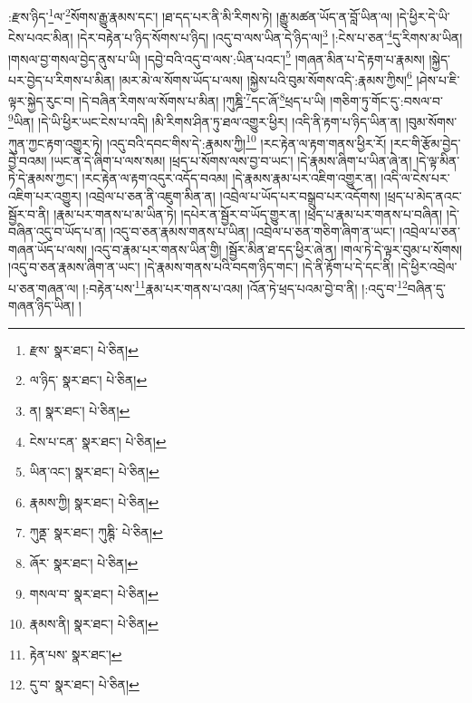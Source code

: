 :རྫས་ཉིད་\footnote{རྫས་  སྣར་ཐང་།  པེ་ཅིན། }ལ་\footnote{ལ་ཉིད་  སྣར་ཐང་།  པེ་ཅིན། }སོགས་རྒྱུ་རྣམས་དང་། །ཐ་དད་པར་ནི་མི་རིགས་ཏེ། །རྒྱུ་མཚན་ཡོད་ན་བློ་ཡིན་ལ། །དེ་ཕྱིར་དེ་ཡི་ངེས་པའང་མིན། །དེར་བརྟེན་པ་ཉིད་སོགས་པ་ཉིད། །འདུ་བ་ལས་ཡིན་དེ་ཉིད་ལ།\footnote{ན།  སྣར་ཐང་།  པེ་ཅིན། } །:ངེས་པ་ཅན་\footnote{ངེས་པ་ངན་  སྣར་ཐང་།  པེ་ཅིན། }དུ་རིགས་མ་ཡིན། །གསལ་བྱ་གསལ་བྱེད་ནུས་པ་ཡི། །དབྱེ་བའི་འདུ་བ་ལས་:ཡིན་པའང་།\footnote{ཡིན་འང་།  སྣར་ཐང་།  པེ་ཅིན། } །གཞན་མིན་པ་དེ་རྟག་པ་རྣམས། །སྐྱེད་པར་བྱེད་པ་རིགས་པ་མིན། །མར་མེ་ལ་སོགས་ཡོད་པ་ལས། །སྐྱེས་པའི་བུམ་སོགས་འདི་:རྣམས་ཀྱིས།\footnote{རྣམས་ཀྱི།  སྣར་ཐང་།  པེ་ཅིན། } །ཤེས་པ་ཇི་ལྟར་སྐྱེད་རུང་བ། །དེ་བཞིན་རིགས་ལ་སོགས་པ་མིན། །ཀུཎྜི་\footnote{ཀུནྡ་  སྣར་ཐང་། ཀུཎྚི་  པེ་ཅིན། }དང་ཞོ་\footnote{ཞོར་  སྣར་ཐང་།  པེ་ཅིན། }ཕྲད་པ་ཡི། །གཅིག་ཏུ་གོང་དུ་:བསལ་བ་\footnote{གསལ་བ་  སྣར་ཐང་།  པེ་ཅིན། }ཡིན། །དེ་ཡི་ཕྱིར་ཡང་ངེས་པ་འདི། །མི་རིགས་ཤིན་ཏུ་ཐལ་འགྱུར་ཕྱིར། །འདི་ནི་རྟག་པ་ཉིད་ཡིན་ན། །བུམ་སོགས་ཀུན་ཀྱང་རྟག་འགྱུར་ཏེ། །འདུ་བའི་དབང་གིས་དེ་:རྣམས་ཀྱི།\footnote{རྣམས་ནི།  སྣར་ཐང་།  པེ་ཅིན། } །རང་རྟེན་ལ་རྟག་གནས་ཕྱིར་རོ། །རང་གི་རྩོམ་བྱེད་བྱེ་བའམ། །ཡང་ན་དེ་ཞིག་པ་ལས་སམ། །ཕྲད་པ་སོགས་ལས་བྱ་བ་ཡང་། །དེ་རྣམས་ཞིག་པ་ཡིན་ཞེ་ན། །དེ་ལྟ་མིན་ཏེ་དེ་རྣམས་ཀྱང་། །རང་རྟེན་ལ་རྟག་འདུར་འདོད་བའམ། །དེ་རྣམས་རྣམ་པར་འཇིག་འགྱུར་ན། །འདི་ལ་ངེས་པར་འཇིག་པར་འགྱུར། །འབྲེལ་པ་ཅན་ནི་འཇུག་མིན་ན། །འབྲེལ་པ་ཡོད་པར་བསྒྲུབ་པར་འདོགས། །ཕྲད་པ་མེད་ནའང་སྦྱོར་བ་ནི། །རྣམ་པར་གནས་པ་མ་ཡིན་ཏེ། །དཔེར་ན་སྦྱོར་བ་ཡོད་གྱུར་ན། །ཕྲད་པ་རྣམ་པར་གནས་པ་བཞིན། །དེ་བཞིན་འདུ་བ་ཡོད་པ་ན། །འདུ་བ་ཅན་རྣམས་གནས་པ་ཡིན། །འབྲེལ་པ་ཅན་གཅིག་ཞིག་ན་ཡང་། །འབྲེལ་པ་ཅན་གཞན་ཡོད་པ་ལས། །འདུ་བ་རྣམ་པར་གནས་ཡིན་གྱི། །སྦྱོར་མིན་ཐ་དད་ཕྱིར་ཞེ་ན། །གལ་ཏེ་དེ་ལྟར་བུམ་པ་སོགས། །འདུ་བ་ཅན་རྣམས་ཞིག་ན་ཡང་། །དེ་རྣམས་གནས་པའི་བདག་ཉིད་གང་། །དེ་ནི་རྟོག་པ་དེ་དང་ནི། །དེ་ཕྱིར་འབྲེལ་པ་ཅན་གཞན་ལ། །:བརྟེན་པས་\footnote{རྟེན་པས་  སྣར་ཐང་། }རྣམ་པར་གནས་པ་འམ། །འོན་ཏེ་ཕྲད་པའམ་བྱེ་བ་ནི། །:འདུ་བ་\footnote{དུ་བ་  སྣར་ཐང་།  པེ་ཅིན། }བཞིན་དུ་གཞན་ཉིད་ཡིན། །
